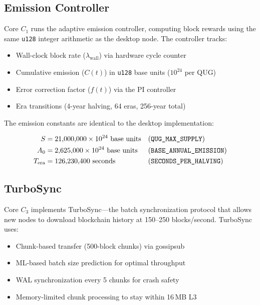 \documentclass[11pt,a4paper]{article}
\begin{document}
\subsection{Emission Controller}

Core $C_1$ runs the adaptive emission controller, computing block rewards using the same \texttt{u128} integer arithmetic as the desktop node. The controller tracks:

\begin{itemize}
    \item Wall-clock block rate ($\lambda_{\text{wall}}$) via hardware cycle counter
    \item Cumulative emission ($C(t)$) in \texttt{u128} base units ($10^{24}$ per QUG)
    \item Error correction factor ($f(t)$) via the PI controller
    \item Era transitions (4-year halving, 64 eras, 256-year total)
\end{itemize}

The emission constants are identical to the desktop implementation:

\begin{align}
    S &= 21{,}000{,}000 \times 10^{24} \text{ base units} && \text{(\texttt{QUG\_MAX\_SUPPLY})} \\
    A_0 &= 2{,}625{,}000 \times 10^{24} \text{ base units} && \text{(\texttt{BASE\_ANNUAL\_EMISSION})} \\
    T_{\text{era}} &= 126{,}230{,}400 \text{ seconds} && \text{(\texttt{SECONDS\_PER\_HALVING})}
\end{align}

\subsection{TurboSync}

Core $C_3$ implements TurboSync---the batch synchronization protocol that allows new nodes to download blockchain history at 150--250 blocks/second. TurboSync uses:

\begin{itemize}
    \item Chunk-based transfer (500-block chunks) via gossipsub
    \item ML-based batch size prediction for optimal throughput
    \item WAL synchronization every 5 chunks for crash safety
    \item Memory-limited chunk processing to stay within 16\,MB L3
\end{itemize}
\end{document}
